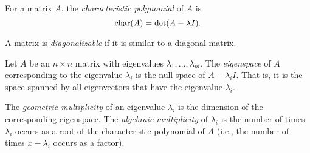 \begin{SaveDefinition}[
	key=CharacteristicPolynomial,
	title={Characteristic Polynomial}]

	For a matrix $A$, the
	\emph{characteristic polynomial} of $A$ is
	\[
		\operatorname{char}(A)=\det(A-\lambda I).
	\]

\end{SaveDefinition}

\begin{SaveDefinition}[key=Diagonalizable, title={Diagonalizable}]
	A matrix is
	\emph{diagonalizable} if it is similar to a diagonal matrix.
\end{SaveDefinition}

\begin{SaveDefinition}[key=Eigenspace, title={Eigenspace}]
	Let $A$ be an $n\times n$ matrix with eigenvalues
	$\lambda_{1},\ldots,\lambda_{m}$. The
	\emph{eigenspace} of $A$ corresponding to the eigenvalue $\lambda_{i}$
	is the null space of $A-\lambda_{i} I$. That is, it is the space spanned
	by all eigenvectors that have the eigenvalue $\lambda_{i}$.

	The
	\emph{geometric multiplicity} of an eigenvalue $\lambda_{i}$ is the
	dimension of the corresponding eigenspace. The
	\emph{algebraic multiplicity} of $\lambda_{i}$ is the number of times
	$\lambda_{i}$ occurs as a root of the characteristic polynomial of $A$ (i.e.,
	the number of times $x-\lambda_{i}$ occurs as a factor).
\end{SaveDefinition}


